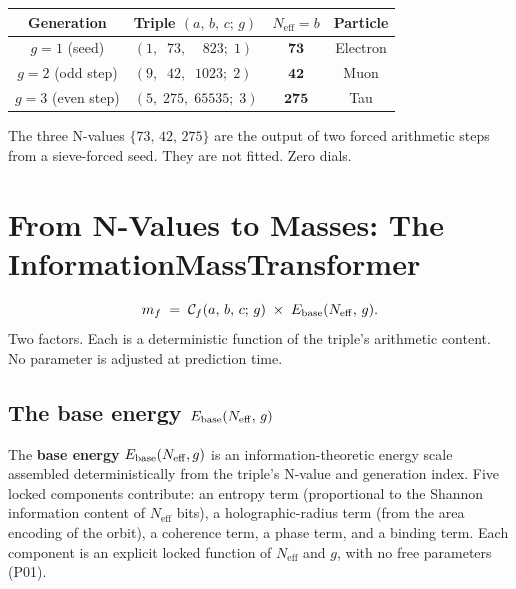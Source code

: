 \documentclass[11pt,a4paper]{article}
\newcommand{\term}[1]{\textbf{#1}}
\newcommand{\lean}[1]{\texttt{#1}}
\newcommand{\Neff}{N_{\mathrm{eff}}}
\newcommand{\CatAL}{\textsf{CatAL}}
\begin{document}
\begin{tcolorbox}[colback=boxorange,colframe=orange!60!black,
  title={Lepton Cascade Result (\CatAL, \lean{update\_map\_produces\_canonical\_orbit})}]
\begin{center}
\renewcommand{\arraystretch}{1.35}
\begin{tabular}{@{}clcc@{}}
\toprule
Generation & Triple $(a,\,b,\,c;\,g)$ & $\Neff = b$ & Particle \\
\midrule
$g = 1$ (seed)      & $(1,\;\;73,\;\;\;\;823;\;1)$ & $\mathbf{73}$  & Electron \\
$g = 2$ (odd step)  & $(9,\;\;42,\;\;1023;\;2)$    & $\mathbf{42}$  & Muon     \\
$g = 3$ (even step) & $(5,\;275,\;65535;\;3)$       & $\mathbf{275}$ & Tau      \\
\bottomrule
\end{tabular}
\end{center}
The three N-values $\{73,\,42,\,275\}$ are the output of two forced arithmetic
steps from a sieve-forced seed.  They are not fitted.  Zero dials.
\end{tcolorbox}

\section{From N-Values to Masses: The InformationMassTransformer}
\label{sec:imt}

\begin{tcolorbox}[colback=boxblue,colframe=blue!40!black,title=The pipeline in one equation]
\[
  m_f \;=\; \mathcal{C}_f(a,\,b,\,c;\,g) \;\times\; E_{\rm base}(N_{\rm eff},\,g).
\]
Two factors.  Each is a deterministic function of the triple's arithmetic content.
No parameter is adjusted at prediction time.
\end{tcolorbox}

\subsection{The base energy $E_{\rm base}(N_{\rm eff},\,g)$}

The \term{base energy} $E_{\rm base}(\Neff, g)$ is an information-theoretic energy
scale assembled deterministically from the triple's N-value and generation index.
Five locked components contribute: an entropy term (proportional to the Shannon
information content of $\Neff$ bits), a holographic-radius term (from the area
encoding of the orbit), a coherence term, a phase term, and a binding term.
Each component is an explicit locked function of $\Neff$ and $g$, with no free
parameters (P01).
\end{document}
